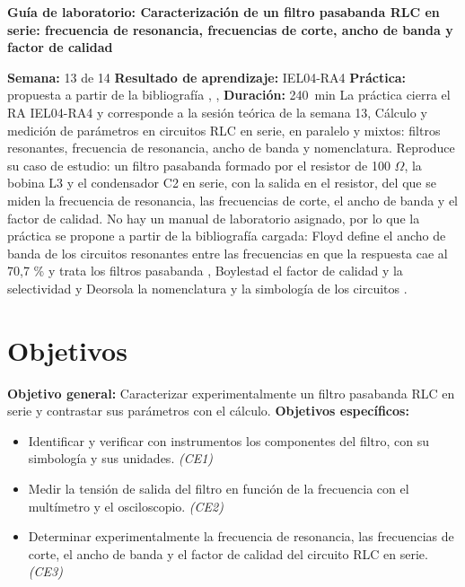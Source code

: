 \documentclass[12pt]{article}
\begin{document}
\nocite{ref1,ref2,ref3}

\datosguia
\lineablanco

{\centering\bfseries Guía de laboratorio: Caracterización de un filtro pasabanda RLC en serie: frecuencia de resonancia, frecuencias de corte, ancho de banda y factor de calidad\par}
\lineablanco
\textbf{Semana:} 13 de 14 \quad \textbf{Resultado de aprendizaje:} IEL04-RA4 \quad \textbf{Práctica:} propuesta a partir de la bibliografía \cite{ref1}, \cite{ref2}, \cite{ref3} \quad \textbf{Duración:} \SI{240}{\minute}
\lineablanco
La práctica cierra el RA IEL04-RA4 y corresponde a la sesión teórica de la semana 13, \guillemotleft{}Cálculo y medición de parámetros en circuitos RLC en serie, en paralelo y mixtos: filtros resonantes, frecuencia de resonancia, ancho de banda y nomenclatura\guillemotright{}. Reproduce su caso de estudio: un filtro pasabanda formado por el resistor de 100 \ensuremath{\Omega}, la bobina L3 y el condensador C2 en serie, con la salida en el resistor, del que se miden la frecuencia de resonancia, las frecuencias de corte, el ancho de banda y el factor de calidad. No hay un manual de laboratorio asignado, por lo que la práctica se propone a partir de la bibliografía cargada: Floyd define el ancho de banda de los circuitos resonantes entre las frecuencias en que la respuesta cae al 70,7 \% y trata los filtros pasabanda \cite{ref1}, Boylestad el factor de calidad y la selectividad \cite{ref2} y Deorsola la nomenclatura y la simbología de los circuitos \cite{ref3}.

\section{Objetivos}\label{sec:objetivos}
\textbf{Objetivo general:} Caracterizar experimentalmente un filtro pasabanda RLC en serie y contrastar sus parámetros con el cálculo.
\lineablanco
\textbf{Objetivos específicos:}
\begin{itemize}
  \item Identificar y verificar con instrumentos los componentes del filtro, con su simbología y sus unidades. \emph{(CE1)}
  \item Medir la tensión de salida del filtro en función de la frecuencia con el multímetro y el osciloscopio. \emph{(CE2)}
  \item Determinar experimentalmente la frecuencia de resonancia, las frecuencias de corte, el ancho de banda y el factor de calidad del circuito RLC en serie. \emph{(CE3)}
\end{itemize}
\end{document}
